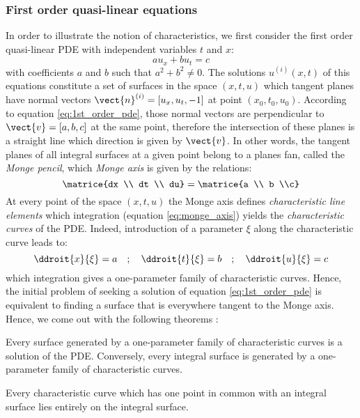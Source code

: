 \subsubsection*{First order quasi-linear equations}
In order to illustrate the notion of characteristics, we first consider the first order quasi-linear PDE with independent variables $t$ and $x$:
\begin{equation}
  \label{eq:1st_order_pde}
   a u_x + b u_t  = c
\end{equation}
with coefficients $a$ and $b$ such that $a^2 + b^2 \neq 0$. The solutions $u^{(i)}(x,t)$ of this equations constitute a set of surfaces in the space $(x,t,u)$ which tangent planes have normal vectors $\vect{n}^{(i)}=[u_x,u_t,-1]$ at point $(x_0,t_0,u_0)$. According to equation \eqref{eq:1st_order_pde}, those normal vectors are perpendicular to $\vect{v}=[a,b,c]$ at the same point, therefore the intersection of these planes is a straight line which direction is given by $\vect{v}$. In other words, the tangent planes of all integral surfaces at a given point belong to a planes fan, called the \textit{Monge pencil}, which \textit{Monge axis} is given by the relations:
\begin{equation}
  \label{eq:monge_axis}
  \matrice{dx \\ dt \\ du} = \matrice{a \\ b \\c}
\end{equation}
At every point of the space $(x,t,u)$ the Monge axis defines \textit{characteristic line elements} which integration (equation \eqref{eq:monge_axis}) yields the \textit{characteristic curves} of the PDE. Indeed, introduction of a parameter $\xi$ along the characteristic curve leads to:
\begin{equation}
  \label{eq:charac_curve}
  \ddroit{x}{\xi} = a \quad ; \quad \ddroit{t}{\xi} = b  \quad ; \quad \ddroit{u}{\xi} = c
\end{equation}
which integration gives a one-parameter family of characteristic curves. Hence, the initial problem of seeking a solution of equation \eqref{eq:1st_order_pde} is equivalent to finding a surface that is everywhere tangent to the Monge axis. Hence, we come out with the following theorems \cite[Chapter~2]{Courant}:
\begin{theorem}
  Every surface generated by a one-parameter family of characteristic curves is a solution of the PDE. Conversely, every integral surface is generated by a one-parameter family of characteristic curves.
\end{theorem}
\begin{theorem}
  \label{th:charac_in_integral_surface}
  Every characteristic curve which has one point in common with an integral surface lies entirely on the integral surface.
\end{theorem}

